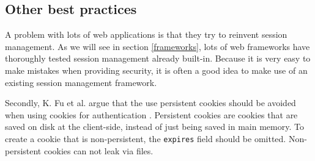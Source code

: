 \subsection{Other best practices}

A problem with lots of web applications is that they try to reinvent session management. As we will see in section \ref{frameworks}, lots of web frameworks have thoroughly tested session management already built-in. Because it is very easy to make mistakes when providing security, it is often a good idea to make use of an existing session management framework.

Secondly, K. Fu et al. argue that the use persistent cookies should be avoided when using cookies for authentication \cite{Fu2001}. Persistent cookies are cookies that are saved on disk at the client-side, instead of just being saved in main memory. To create a cookie that is non-persistent, the \texttt{expires} field should be omitted. Non-persistent cookies can not leak via files.
